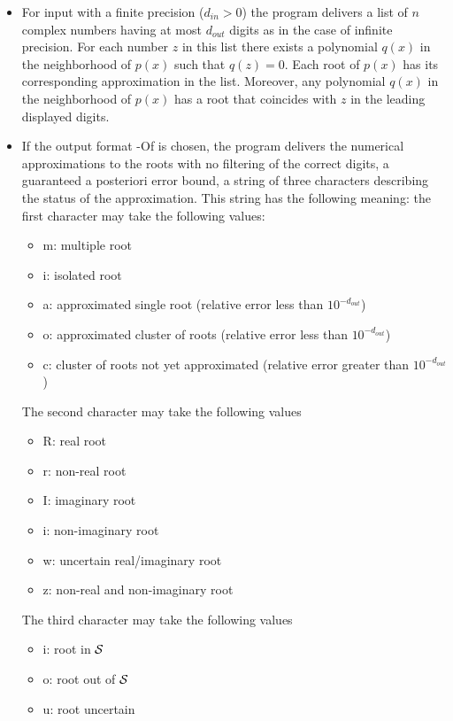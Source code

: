 \documentclass{article}
\begin{document}
\begin{description}
\begin{itemize}
   \item
   For input with a finite precision ($d_{in}>0$) the program delivers
   a list of $n$ complex numbers having at most $d_{out}$ digits as in
   the case of infinite precision. For each number $z$ in this list
   there exists a polynomial $q(x)$ in the neighborhood of $p(x)$ 
   such that $q(z)=0$. Each root of $p(x)$ has its corresponding
   approximation in the list. Moreover, any polynomial $q(x)$ in the
 neighborhood of $p(x)$ has a root that coincides with $z$ in the 
leading displayed digits.

   \item 
   If the output format -Of is chosen, the program delivers the
   numerical approximations to the roots with no filtering of the
   correct digits, a guaranteed a posteriori error bound, a string of
   three characters describing the status of the approximation.  This
   string has the following meaning: the first character may take the
   following values: 
   \begin{itemize} 
     \item m:  multiple root    
     \item i:  isolated root 
     \item a:  approximated single root (relative error less than 
                $10^{-d_{out}}$)
     \item o:  approximated cluster of roots (relative error less than
                $10^{-d_{out}}$)
     \item c:  cluster of roots not yet approximated (relative error
                greater than $10^{-d_{out}}$) 
   \end{itemize} 
   The second character may take the following
   values 
   \begin{itemize} 
       \item R:  real root
       \item r:  non-real root
       \item I:  imaginary root
       \item i:  non-imaginary root
       \item w:  uncertain real/imaginary root
       \item z:  non-real and non-imaginary root
   \end{itemize} 
   The third character may take the following values
   \begin{itemize}
       \item i:  root in $\cal S$
       \item o:  root out of  $\cal S$
       \item u:  root  uncertain
   \end{itemize}
 

\end{itemize}
\end{description}
\end{document}
